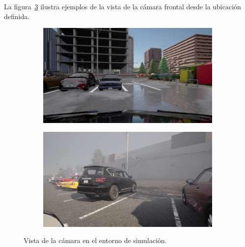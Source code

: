La figura~\ref{fig:camera-view} ilustra ejemplos de la vista de la cámara frontal desde la ubicación definida.

\begin{figure}[!ht]
    \centering
    \begin{subfigure}{0.4\textwidth}
        \includegraphics[width=\textwidth]{img/mirrow_camara_ex}\label {fig:camara}
    \end{subfigure}
    \begin{subfigure}{0.4\textwidth}
        \includegraphics[width=\textwidth]{img/mirrow_camara_ex2}\label {fig:camara2}
    \end{subfigure}
    \caption{Vista de la cámara en el entorno de simulación.}
    \label{fig:camera-view}
\end{figure}




